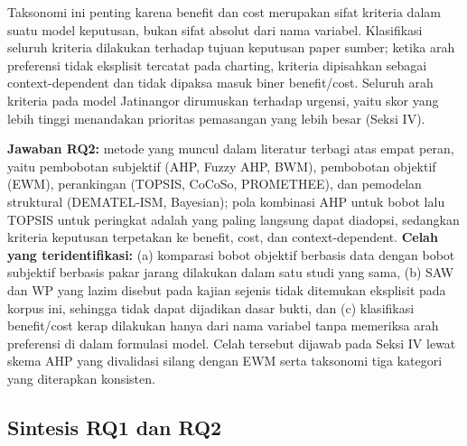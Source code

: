 \documentclass[conference]{IEEEtran}
\begin{document}
Taksonomi ini penting karena benefit dan cost merupakan sifat kriteria dalam suatu model keputusan, bukan sifat absolut dari nama variabel. Klasifikasi seluruh kriteria dilakukan terhadap tujuan keputusan paper sumber; ketika arah preferensi tidak eksplisit tercatat pada charting, kriteria dipisahkan sebagai context-dependent dan tidak dipaksa masuk biner benefit/cost. Seluruh arah kriteria pada model Jatinangor dirumuskan terhadap urgensi, yaitu skor yang lebih tinggi menandakan prioritas pemasangan yang lebih besar (Seksi IV).

\textbf{Jawaban RQ2:} metode yang muncul dalam literatur terbagi atas empat peran, yaitu pembobotan subjektif (AHP, Fuzzy AHP, BWM), pembobotan objektif (EWM), perankingan (TOPSIS, CoCoSo, PROMETHEE), dan pemodelan struktural (DEMATEL-ISM, Bayesian); pola kombinasi AHP untuk bobot lalu TOPSIS untuk peringkat adalah yang paling langsung dapat diadopsi, sedangkan kriteria keputusan terpetakan ke benefit, cost, dan context-dependent. \textbf{Celah yang teridentifikasi:} (a) komparasi bobot objektif berbasis data dengan bobot subjektif berbasis pakar jarang dilakukan dalam satu studi yang sama, (b) SAW dan WP yang lazim disebut pada kajian sejenis tidak ditemukan eksplisit pada korpus ini, sehingga tidak dapat dijadikan dasar bukti, dan (c) klasifikasi benefit/cost kerap dilakukan hanya dari nama variabel tanpa memeriksa arah preferensi di dalam formulasi model. Celah tersebut dijawab pada Seksi IV lewat skema AHP yang divalidasi silang dengan EWM serta taksonomi tiga kategori yang diterapkan konsisten.

\subsection{Sintesis RQ1 dan RQ2}
\end{document}
